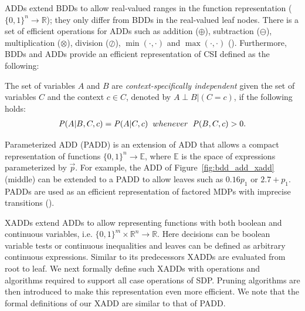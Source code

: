 \documentclass[twoside,11pt]{article}
\newenvironment{mydef}[1][Definition]{\begin{trivlist}
\item[\hskip \labelsep {\bfseries #1}]}{\end{trivlist}}
\begin{document}
ADDs extend BDDs to allow real-valued ranges in the function representation ($\lbrace 0,1\rbrace^n \rightarrow \mathbb{R}$); they only differ from BDDs in the real-valued leaf nodes. There is a set of efficient operations for ADDs such as addition
($\oplus$), subtraction ($\ominus$), multiplication ($\otimes$),
division ($\oslash$), $\min(\cdot,\cdot)$ and $\max(\cdot,\cdot)$ (\cite{bahar93add}). Furthermore, BDDs and ADDs provide an efficient representation of CSI defined as the following: 
\begin{mydef}
The set of variables $A$ and $B$ are \emph{context-specifically independent} given the set of variables $C$ and the context $c \in C$, denoted by $A \perp B | (C=c)$, if the following holds: 
\begin{align}
\mathit{P}(A | B,C,c) = \mathit{P}(A|C,c) \hspace{2mm} whenever \hspace{2mm} \mathit{P}(B,C,c) >0. \label{def:csi}
\end{align}
\end{mydef}


Parameterized ADD (PADD) is an extension of ADD that allows a compact representation of functions $\{0,1\}^{n} \rightarrow
\mathbb{E}$, where $\mathbb{E}$ is the space of expressions
parameterized by $\vec{p}$. For example, the ADD of Figure~\ref{fig:bdd_add_xadd} (middle) can be extended to a PADD to allow leaves such as $0.16p_1$ or $2.7+p_1$. PADDs are used as an efficient representation of factored MDPs with imprecise transitions (\cite{spuddip}). 

XADDs extend ADDs to allow representing functions with both boolean and continuous variables, i.e. $\{0,1\}^{m} \times \mathbb{R}^n \rightarrow \mathbb{R}$. Here decisions can be boolean variable tests or continuous inequalities and leaves can be defined as arbitrary continuous expressions. Similar to its predecessors XADDs are evaluated from root to leaf. 
We next formally define such XADDs with operations and algorithms required to support all case operations of SDP. Pruning algorithms are then introduced to make this representation even more efficient. We note that the formal definitions of our XADD are similar to that of PADD.
\end{document}
